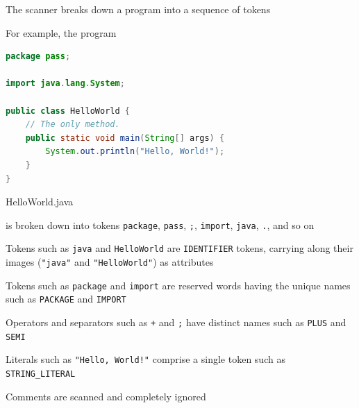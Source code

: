 \documentclass[8pt,a4paper,compress]{beamer}
\begin{document}
\begin{frame}[fragile]
\pause

The scanner breaks down a \jmm program into a sequence of tokens

\pause\bigskip

For example, the program

\begin{tcolorbox}[enhanced,drop shadow southwest,sharp corners,size=fbox,colback=white,fontlower=\small\ttfamily,collower=silver900]

\begin{lstlisting}[language=Java,style=focusin]
package pass;

import java.lang.System;

public class HelloWorld {
    // The only method.
    public static void main(String[] args) {
        System.out.println("Hello, World!");
    }
}
\end{lstlisting}

\tcblower
\begin{minipage}[t][.2cm][t]{\textwidth}
HelloWorld.java
\end{minipage}
\end{tcolorbox}

\noindent is broken down into tokens \lstinline{package}, \lstinline{pass}, \lstinline{;}, \lstinline{import}, \lstinline{java}, \lstinline{.}, and so on

\pause\bigskip

Tokens such as \lstinline{java} and \lstinline{HelloWorld} are \lstinline{IDENTIFIER} tokens, carrying along their images (\lstinline{"java"} and \lstinline{"HelloWorld"}) as attributes

\pause\bigskip

Tokens such as \lstinline{package} and \lstinline{import} are reserved words having the unique names such as \lstinline{PACKAGE} and \lstinline{IMPORT}

\pause\bigskip

Operators and separators such as \lstinline{+} and \lstinline{;} have distinct names such as \lstinline{PLUS} and \lstinline{SEMI}

\pause\bigskip

Literals such as \lstinline{"Hello, World!"} comprise a single token such as \lstinline{STRING_LITERAL}

\pause\bigskip

Comments are scanned and completely ignored
\end{frame}
\end{document}
